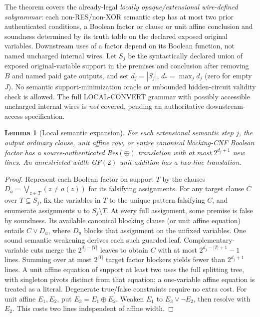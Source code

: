 \documentclass[11pt]{article}
\newtheorem{lemma}{Lemma}
\begin{document}
The theorem covers the already-legal \emph{locally opaque/extensional wire-defined subgrammar}: each non-RES/non-XOR semantic step has at most two prior authenticated conditions, a Boolean factor or clause or unit affine conclusion and soundness determined by its truth table on the declared exposed original variables. Downstream uses of a factor depend on its Boolean function, not named uncharged internal wires. Let $S_j$ be the syntactically declared union of exposed original-variable support in the premises and conclusion after removing $B$ and named paid gate outputs, and set $d_j=|S_j|$, $d_*=\max_j d_j$ (zero for empty $J$). No semantic support-minimization oracle or unbounded hidden-circuit validity check is allowed. The full LOCAL-CONVERT grammar with possibly accessible uncharged internal wires is \emph{not} covered, pending an authoritative downstream-access specification.

\begin{lemma}[Local semantic expansion]\label{lem}
For each extensional semantic step $j$, the output ordinary clause, unit affine row, or entire canonical blocking-CNF Boolean factor has a source-authenticated Res$(\oplus)$ translation with at most $2^{d_j+1}$ new lines. An unrestricted-width GF$(2)$ unit addition has a two-line translation.
\end{lemma}
\begin{proof}
Represent each Boolean factor on support $T$ by the clauses $D_a=\bigvee_{z\in T}(z\ne a(z))$ for its falsifying assignments. For any target clause $C$ over $T\subseteq S_j$, fix the variables in $T$ to the unique pattern falsifying $C$, and enumerate assignments $u$ to $S_j\setminus T$. At every full assignment, some premise is false by soundness. Its available canonical blocking clause (or unit affine equation) entails $C\vee D_u$, where $D_u$ blocks that assignment on the unfixed variables. One sound semantic weakening derives each such guarded leaf. Complementary-variable cuts merge the $2^{d_j-|T|}$ leaves to obtain $C$ with at most $2^{d_j-|T|+1}-1$ lines. Summing over at most $2^{|T|}$ target factor blockers yields fewer than $2^{d_j+1}$ lines. A unit affine equation of support at least two uses the full splitting tree, with singleton pivots distinct from that equation; a one-variable affine equation is treated as a literal. Degenerate true/false constraints require no extra cost. For unit affine $E_1,E_2$, put $E_3=E_1\oplus E_2$. Weaken $E_1$ to $E_3\vee\neg E_2$, then resolve with $E_2$. This costs two lines independent of affine width.
\end{proof}
\end{document}
